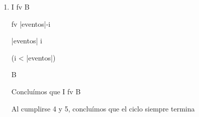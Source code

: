 \documentclass[10pt,a4paper]{article}
\begin{document}
\begin{enumerate}
    \equiv eventos[i]=true \yLuego ((eventos[i]=true \wedge (def(res=res*apuestas_c*pagos_c) \yLuego (|eventos|-(i+1) < v_0)_{res*apuestas_c*pagos_c}^{res}) \vee (eventos[i]=false \wedge (def(res=res*apuestas_s*pagos_s) \yLuego (|eventos|-(i+1) < v_0)_{res*apuestas_s*pagos_s}^{res})
    \vspace{2mm}

    \equiv eventos[i]=true \yLuego (eventos[i]=true \yLuego |eventos|-(i+1) < v_0) \vee (eventos[i]=false \yLuego |eventos|-(i+1) < v_0)
    \vspace{2mm}

    \equiv (eventos[i]=true \vee eventos[i]=false) \wedge |eventos|-(i+1) < v_0
    \vspace{2mm}

    \equiv |eventos|-(i+1) < v_0
    \vspace{2mm}

    fv=v_0 \hspace{3} equivale \hspace{3} a \hspace{3} |eventos|-i, entonces \hspace{3} reemplazamos \hspace{3} v_0 \hspace{3} con \hspace{3} esa \hspace{3} expresión:
    \vspace{2mm}

    \equiv |eventos|-(i+1) < |eventos|-i
    \vspace{2mm}

    \equiv -(i+1) < -i
    \vspace{2mm}

    \equiv i+1 > i
    \vspace{2mm}

    Concluímos que {\{I \wedge B\ \wedge fv=v_0\} \hspace{2} S \hspace{2} \{fv<v_0\}}
    \vspace{2mm}

    \item I \wedge fv  \implica \neg B
    \vspace{2mm}

    fv  \equiv |eventos|-i 
    \vspace{2mm}

    \hspace{27} \equiv |eventos| \leq i
    \vspace{2mm}

    \hspace{19} \implica \hspace{2} \neg (i < |eventos|)
    \vspace{2mm}

    \hspace{27} \equiv \neg B
    \vspace{2mm}

    {Concluímos que I \wedge fv  \implica \neg B}
    \vspace{2mm}

    {Al cumplirse 4 y 5, concluímos que el ciclo siempre termina}
    
\end{enumerate}
\end{document}
